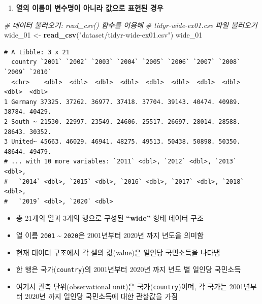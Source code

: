 \documentclass[
  11pt,
]{krantz}
\makeatletter
\newenvironment{Shaded}{\begin{snugshade}}{\end{snugshade}}
\newcommand{\CommentTok}[1]{\textcolor[rgb]{0.37,0.37,0.37}{\textit{#1}}}
\newcommand{\DecValTok}[1]{\textcolor[rgb]{0.06,0.06,0.06}{#1}}
\newcommand{\KeywordTok}[1]{\textcolor[rgb]{0.27,0.27,0.27}{\textbf{#1}}}
\newcommand{\NormalTok}[1]{#1}
\newcommand{\StringTok}[1]{\textcolor[rgb]{0.5,0.5,0.5}{#1}}
\providecommand{\tightlist}{%
  \setlength{\itemsep}{0pt}\setlength{\parskip}{0pt}}
\newenvironment{kframe}{%
\medskip{}
\setlength{\fboxsep}{.8em}
 \def\at@end@of@kframe{}%
 \ifinner\ifhmode%
  \def\at@end@of@kframe{\end{minipage}}%
  \begin{minipage}{\columnwidth}%
 \fi\fi%
 \def\FrameCommand##1{\hskip\@totalleftmargin \hskip-\fboxsep
 \colorbox{shadecolor}{##1}\hskip-\fboxsep
     \hskip-\linewidth \hskip-\@totalleftmargin \hskip\columnwidth}%
 \MakeFramed {\advance\hsize-\width
   \@totalleftmargin\z@ \linewidth\hsize
   \@setminipage}}%
 {\par\unskip\endMakeFramed%
 \at@end@of@kframe}
\renewenvironment{quote}{\begin{kframe}}{\end{kframe}}
\makeatother
\begin{document}
\begin{enumerate}
\def\labelenumi{\arabic{enumi}.}
\tightlist
\item
  \textbf{열의 이름이 변수명이 아니라 값으로 표현된 경우}
\end{enumerate}

\footnotesize

\begin{Shaded}
\begin{Highlighting}[]
\CommentTok{# 데이터 불러오기: read_csv() 함수를 이용해 }
\CommentTok{# tidyr-wide-ex01.csv 파일 불러오기}
\NormalTok{wide_}\DecValTok{01}\NormalTok{ <-}\StringTok{ }\KeywordTok{read_csv}\NormalTok{(}\StringTok{"dataset/tidyr-wide-ex01.csv"}\NormalTok{)}
\NormalTok{wide_}\DecValTok{01}
\end{Highlighting}
\end{Shaded}

\begin{verbatim}
# A tibble: 3 x 21
  country `2001` `2002` `2003` `2004` `2005` `2006` `2007` `2008` `2009` `2010`
  <chr>    <dbl>  <dbl>  <dbl>  <dbl>  <dbl>  <dbl>  <dbl>  <dbl>  <dbl>  <dbl>
1 Germany 37325. 37262. 36977. 37418. 37704. 39143. 40474. 40989. 38784. 40429.
2 South ~ 21530. 22997. 23549. 24606. 25517. 26697. 28014. 28588. 28643. 30352.
3 United~ 45663. 46029. 46941. 48275. 49513. 50438. 50898. 50350. 48644. 49479.
# ... with 10 more variables: `2011` <dbl>, `2012` <dbl>, `2013` <dbl>,
#   `2014` <dbl>, `2015` <dbl>, `2016` <dbl>, `2017` <dbl>, `2018` <dbl>,
#   `2019` <dbl>, `2020` <dbl>
\end{verbatim}

\normalsize

\begin{quote}
\begin{itemize}
\tightlist
\item
  총 21개의 열과 3개의 행으로 구성된 \textbf{``wide''} 형태 데이터 구조
\item
  열 이름 \texttt{2001} \textasciitilde{} \texttt{2020}은 2001년부터 2020년 까지 년도을 의미함
\item
  현재 데이터 구조에서 각 셀의 값(value)은 일인당 국민소득을 나타냄
\item
  한 행은 국가(\texttt{country})의 2001년부터 2020년 까지 년도 별 일인당 국민소득
\item
  여기서 관측 단위(observational unit)은 국가(\texttt{country})이며, 각 국가는 2001년부터 2020년 까지 일인당 국민소득에 대한 관찰값을 가짐
\end{itemize}
\end{quote}
\end{document}

